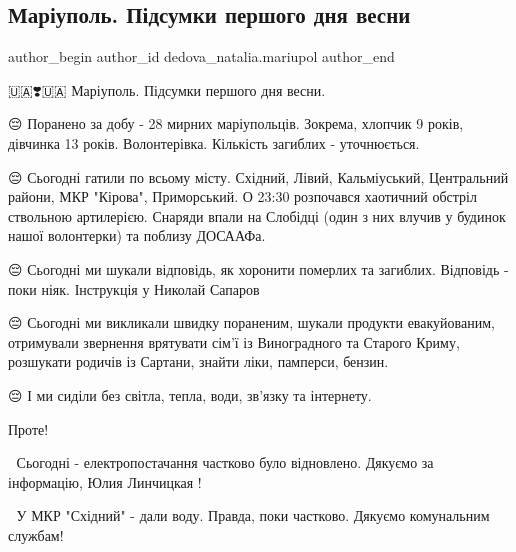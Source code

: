  
 
 
 
 

\subsection{Маріуполь. Підсумки першого дня весни}
\label{sec:02_03_2022.fb.dedova_natalia.mariupol.1.mar_upol__p_dsumki_p}

\ifcmt
 author_begin
   author_id dedova_natalia.mariupol
 author_end
\fi

🇺🇦❣️🇺🇦 Маріуполь. Підсумки першого дня весни.

😔 Поранено за добу - 28 мирних маріупольців. Зокрема, хлопчик 9 років,
дівчинка 13 років. Волонтерівка. Кількість загиблих - уточнюється. 

😔 Сьогодні гатили по всьому місту. Східний, Лівий, Кальміуський, Центральний
райони, МКР "Кірова", Приморський. О 23:30 розпочався хаотичний обстріл
ствольною артилерією. Снаряди впали на Слобідці (один з них влучив у будинок
нашої волонтерки) та поблизу ДОСААФа. 

😔 Сьогодні ми шукали відповідь, як хоронити померлих та загиблих. Відповідь -
поки ніяк. Інструкція у Николай Сапаров 

😔 Сьогодні ми викликали швидку пораненим, шукали продукти евакуйованим,
отримували звернення врятувати сім'ї із Виноградного та Старого Криму,
розшукати родичів із Сартани, знайти ліки, памперси, бензин. 

😔 І ми сиділи без світла, тепла, води, зв'язку та інтернету.

Проте! 

🙂 Сьогодні - електропостачання частково було відновлено. Дякуємо за
інформацію, Юлия Линчицкая !

🙂 У МКР "Східний" - дали воду. Правда, поки частково. Дякуємо комунальним
службам! 

